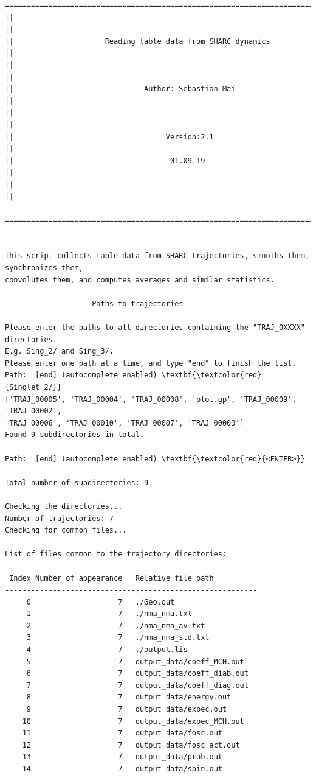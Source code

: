 \documentclass[a4paper,11pt,DIV=15,openany]{scrbook}
\begin{document}
\begin{oframed}
\footnotesize\begin{Verbatim}[commandchars=\\\{\}]
  ================================================================================
||                                                                                ||
||                     Reading table data from SHARC dynamics                     ||
||                                                                                ||
||                              Author: Sebastian Mai                             ||
||                                                                                ||
||                                   Version:2.1                                  ||
||                                    01.09.19                                    ||
||                                                                                ||
  ================================================================================


This script collects table data from SHARC trajectories, smooths them, synchronizes them,
convolutes them, and computes averages and similar statistics.
  
--------------------Paths to trajectories-------------------

Please enter the paths to all directories containing the "TRAJ_0XXXX" directories.
E.g. Sing_2/ and Sing_3/. 
Please enter one path at a time, and type "end" to finish the list.
Path:  [end] (autocomplete enabled) \textbf{\textcolor{red}{Singlet_2/}}
['TRAJ_00005', 'TRAJ_00004', 'TRAJ_00008', 'plot.gp', 'TRAJ_00009', 'TRAJ_00002', 
'TRAJ_00006', 'TRAJ_00010', 'TRAJ_00007', 'TRAJ_00003']
Found 9 subdirectories in total.

Path:  [end] (autocomplete enabled) \textbf{\textcolor{red}{<ENTER>}}

Total number of subdirectories: 9

Checking the directories...
Number of trajectories: 7
Checking for common files...

List of files common to the trajectory directories:

 Index Number of appearance   Relative file path
----------------------------------------------------------
     0                    7   ./Geo.out
     1                    7   ./nma_nma.txt
     2                    7   ./nma_nma_av.txt
     3                    7   ./nma_nma_std.txt
     4                    7   ./output.lis
     5                    7   output_data/coeff_MCH.out
     6                    7   output_data/coeff_diab.out
     7                    7   output_data/coeff_diag.out
     8                    7   output_data/energy.out
     9                    7   output_data/expec.out
    10                    7   output_data/expec_MCH.out
    11                    7   output_data/fosc.out
    12                    7   output_data/fosc_act.out
    13                    7   output_data/prob.out
    14                    7   output_data/spin.out


\end{Verbatim}
\end{oframed}
\end{document}
